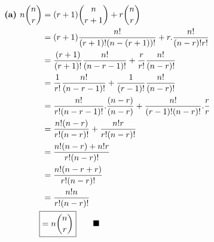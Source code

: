
\begin{align*}
  \text{\bf (a) } n \binom{n}{r} & = (r+1)\binom{n}{r+1} + r\binom{n}{r} \\
  & = (r+1) \frac{n!}{(r+1)!(n-(r+1))!} + r.\frac{n!}{(n-r)!r!} \\
  & = \frac{(r+1)}{(r+1)!}\frac{n!}{(n-r-1)!} + \frac{r}{r!}\frac{n!}{(n-r)!} \\
  & = \frac{1}{r!}\frac{n!}{(n-r-1)!} + \frac{1}{(r-1)!}\frac{n!}{(n-r)!} \\
  & = \frac{n!}{r!(n-r-1)!}.\frac{(n-r)}{(n-r)} + \frac{n!}{(r-1)!(n-r)!}.\frac{r}{r} \\
  & = \frac{n!(n-r)}{r!(n-r)!} + \frac{n!r}{r!(n-r)!} \\
  & = \frac{n!(n-r) + n!r}{r!(n-r)!} \\
  & = \frac{n!(n-r+r)}{r!(n-r)!} \\
  & = \frac{n!n}{r!(n-r)!} \\
  \Aboxed{ & = n \binom{n}{r}} \qquad \blacksquare
\end{align*}

